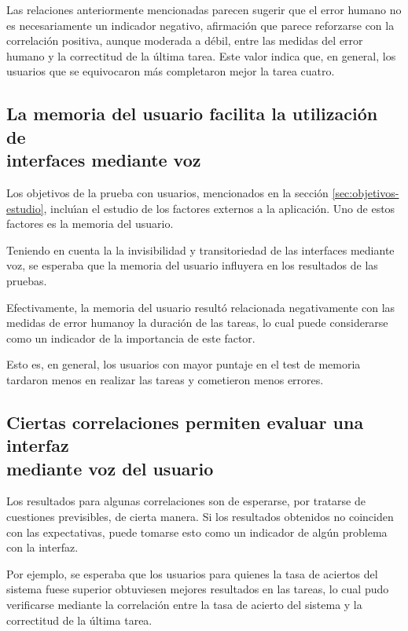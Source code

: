 Las relaciones anteriormente mencionadas parecen sugerir que el error humano no es necesariamente
un indicador negativo, afirmaci\'on que parece reforzarse con la correlaci\'on positiva, aunque moderada
a d\'ebil, entre las medidas del error humano y la correctitud de la \'ultima tarea. Este valor
indica que, en general, los usuarios que se equivocaron m\'as completaron mejor la tarea cuatro.

\subsection[La memoria del usuario facilita la utilizaci\'on de interfaces \\ mediante voz]
{La memoria del usuario facilita la utilizaci\'on de \\ interfaces mediante voz}
Los objetivos de la prueba con usuarios, mencionados en la secci\'on \ref{sec:objetivos-estudio},
inclu{\'\i}an el estudio de los factores externos a la aplicaci\'on. Uno de estos factores
es la memoria del usuario.

Teniendo en cuenta la la invisibilidad y transitoriedad de las interfaces mediante
voz, se esperaba que la memoria del usuario influyera en los resultados de
las pruebas.

Efectivamente, la memoria del usuario result\'o relacionada negativamente con las medidas 
de error humanoy la duraci\'on de las tareas, lo cual puede considerarse como un indicador de 
la importancia de este factor.

Esto es, en general, los usuarios con mayor puntaje en el test de memoria
tardaron menos en realizar las tareas y cometieron menos errores.

\subsection[Ciertas correlaciones permiten evaluar una interfaz mediante voz del usuario]
{Ciertas correlaciones permiten evaluar una interfaz \\ mediante voz del usuario}

Los resultados para algunas correlaciones son de esperarse, por tratarse de cuestiones
previsibles, de cierta manera. Si los resultados obtenidos no coinciden con las expectativas,
puede tomarse esto como un indicador de alg\'un problema con la interfaz. 

Por ejemplo, se esperaba que los usuarios para quienes la tasa de aciertos del sistema fuese superior
obtuviesen mejores resultados en las tareas, lo cual pudo verificarse mediante la correlaci\'on 
entre la tasa de acierto del sistema y la correctitud de la \'ultima tarea.

